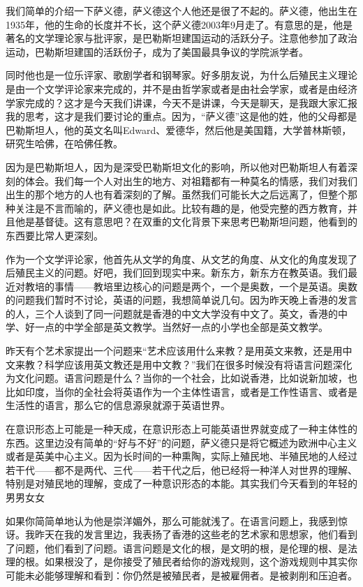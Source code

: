 \documentclass[UTF8, 12pt, a4paper]{ctexrep}
\begin{document}
我们简单的介绍一下萨义德，萨义德这个人他还是很了不起的。萨义德，他出生在1935年，他的生命的长度并不长，这个萨义德2003年9月走了。有意思的是，他是著名的文学理论家与批评家，是巴勒斯坦建国运动的活跃分子。注意他参加了政治运动，巴勒斯坦建国的活跃份子，成为了美国最具争议的学院派学者。

同时他也是一位乐评家、歌剧学者和钢琴家。好多朋友说，为什么后殖民主义理论是由一个文学评论家来完成的，并不是由哲学家或者是由社会学家，或者是由经济学家完成的？这才是今天我们讲课，今天不是讲课，今天是聊天，是我跟大家汇报我的思考，这才是我们要讨论的重点。因为，“萨义德”这是他的姓，他的父母都是巴勒斯坦人，他的英文名叫Edward、爱德华，然后他是美国籍，大学普林斯顿，研究生哈佛，在哈佛任教。

因为是巴勒斯坦人，因为是深受巴勒斯坦文化的影响，所以他对巴勒斯坦人有着深刻的体会。我们每一个人对出生的地方、对祖籍都有一种莫名的情感，我们对我们出生的那个地方的人也有着深刻的了解。虽然我们可能长大之后远离了，但整个那种关注是不言而喻的，萨义德也是如此。比较有趣的是，他受完整的西方教育，并且他是基督徒。这有意思吧？在双重的文化背景下来思考巴勒斯坦问题，他看到的东西要比常人更深刻。

作为一个文学评论家，他首先从文学的角度、从文艺的角度、从文化的角度发现了后殖民主义的问题。好吧，我们回到现实中来。新东方，新东方在教英语。我们最近对教培的事情——教培里边核心的问题是两个，一个是奥数，一个是英语。奥数的问题我们暂时不讨论，英语的问题，我想简单说几句。因为昨天晚上香港的发言的人，三个人谈到了同一问题就是香港的中文大学没有中文了。英文，香港的中学、好一点的中学全部是英文教学。当然好一点的小学也全部是英文教学。

昨天有个艺术家提出一个问题来“艺术应该用什么来教？是用英文来教，还是用中文来教？科学应该用英文教还是用中文教？”我们在很多时候没有将语言问题深化为文化问题。语言问题是什么？当你的一个社会，比如说香港，比如说新加坡，也比如印度，当你的全社会将英语作为一个主体性语言，或者是工作性语言、或者是生活性的语言，那么它的信息源泉就源于英语世界。

在意识形态上可能是一种天成，在意识形态上可能英语世界就变成了一种主体性的东西。这里边没有简单的“好与不好”的问题，萨义德只是将它概述为欧洲中心主义或者是英美中心主义。因为长时间的一种熏陶，实际上殖民地、半殖民地的人经过若干代——都不是两代、三代——若干代之后，他已经将一种洋人对世界的理解、特别是对殖民地的理解，变成了一种意识形态的本能。其实我们今天看到的年轻的男男女女

如果你简简单地认为他是崇洋媚外，那么可能就浅了。在语言问题上，我感到惊讶。我昨天在我的发言里边，我表扬了香港的这些老的艺术家和思想家，他们看到了问题，他们看到了问题。语言问题是文化的根，是文明的根，是伦理的根、是法理的根。如果根没了，是你接受了殖民者给你的游戏规则，这个游戏规则中其实你可能未必能够理解和看到：你仍然是被殖民者，是被雇佣者。是被剥削和压迫者。
\end{document}
